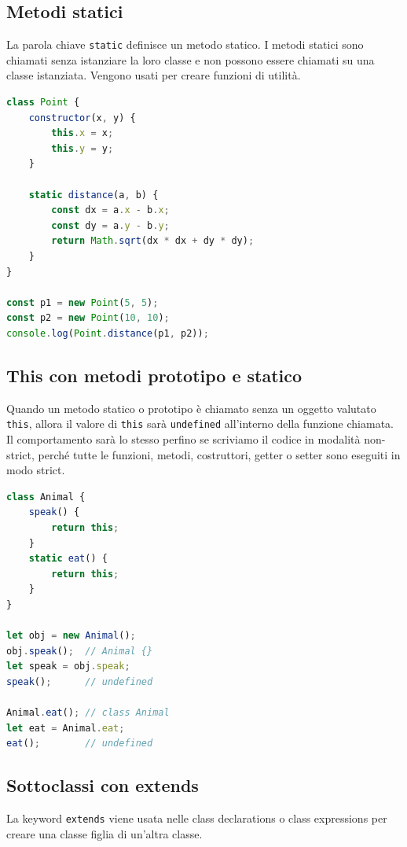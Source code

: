 \subsection{Metodi statici}

La parola chiave \texttt{static} definisce un metodo statico. I metodi statici sono chiamati senza istanziare la loro classe e non possono essere chiamati su una classe istanziata. Vengono usati per creare funzioni di utilità.

\begin{lstlisting}[language=JavaScript]
class Point {
    constructor(x, y) {
        this.x = x;
        this.y = y;
    }

    static distance(a, b) {
        const dx = a.x - b.x;
        const dy = a.y - b.y;
        return Math.sqrt(dx * dx + dy * dy);
    }
}

const p1 = new Point(5, 5);
const p2 = new Point(10, 10);
console.log(Point.distance(p1, p2));
\end{lstlisting}

\subsection{This con metodi prototipo e statico}

Quando un metodo statico o prototipo è chiamato senza un oggetto valutato \texttt{this}, allora il valore di \texttt{this} sarà \texttt{undefined} all'interno della funzione chiamata. Il comportamento sarà lo stesso perfino se scriviamo il codice in modalità non-strict, perché tutte le funzioni, metodi, costruttori, getter o setter sono eseguiti in modo strict.

\begin{lstlisting}[language=JavaScript]
class Animal {
    speak() {
        return this;
    }
    static eat() {
        return this;
    }
}

let obj = new Animal();
obj.speak();  // Animal {}
let speak = obj.speak;
speak();      // undefined

Animal.eat(); // class Animal
let eat = Animal.eat;
eat();        // undefined
\end{lstlisting}

\subsection{Sottoclassi con extends}

La keyword \texttt{extends} viene usata nelle class declarations o class expressions per creare una classe figlia di un'altra classe.

